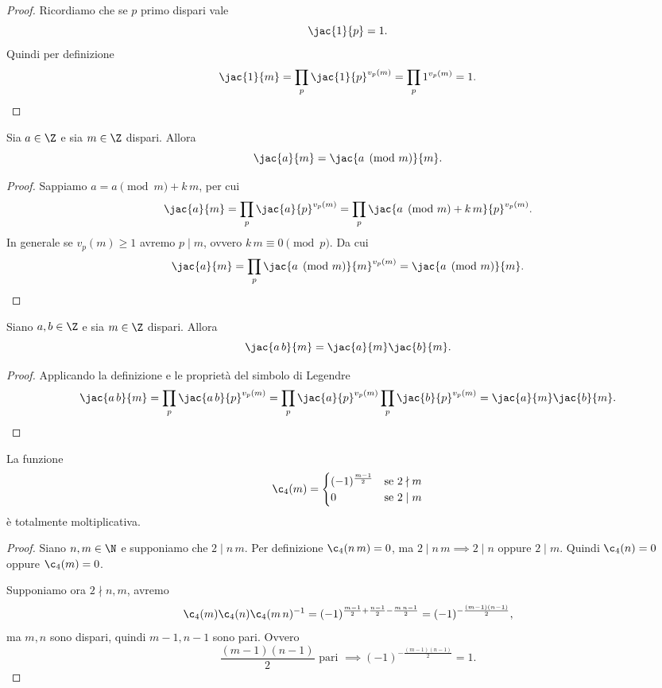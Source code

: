 \begin{proof}
	Ricordiamo che se \(p\) primo dispari vale
	\[
		\jac{1}{p} = 1.
	\]
	Quindi per definizione
	\[
		\jac{1}{m} = \prod_p \jac{1}{p}^{v_p(m)} = \prod_p 1^{v_p(m)} =1.\qedhere
	\]
\end{proof}

\begin{pr}
	Sia \(a\in \Z\) e sia \(m\in \Z\) dispari. Allora
	\[
		\jac{a}{m} = \jac{a \pmod{m}}{m}.
	\]
\end{pr}

\begin{proof}
	Sappiamo \(a= a\pmod{m}+k\,m\), per cui
	\[
		\jac{a}{m} = \prod_p \jac{a}{p}^{v_p(m)} = \prod_p \jac{a\pmod{m}+k\,m}{p}^{v_p(m)}.
	\]
	In generale se \(v_p(m)\ge 1\) avremo \(p\mid m\), ovvero \(k\,m \equiv 0\pmod{p}\).
	Da cui
	\[
		\jac{a}{m} = \prod_p \jac{a \pmod{m}}{m}^{v_p(m)} = \jac{a\pmod{m}}{m}.\qedhere
	\]
\end{proof}

\begin{pr}
	Siano \(a,b\in \Z\) e sia \(m\in\Z\) dispari.
	Allora
	\[
		\jac{a\,b}{m} = \jac{a}{m} \jac{b}{m}.
	\]
\end{pr}

\begin{proof}
	Applicando la definizione e le proprietà del simbolo di Legendre
	\[
		\jac{a\,b}{m} = \prod_p \jac{a\,b}{p}^{v_p(m)} = \prod_p \jac{a}{p}^{v_p(m)}\prod_p \jac{b}{p}^{v_p(m)} = \jac{a}{m}\jac{b}{m}.\qedhere
	\]
\end{proof}

\begin{lem}
	La funzione
	\[
		\c_4(m) = 	\begin{cases}
			(-1)^{\frac{m-1}{2}} & \text{se }2\nmid m \\
			0                    & \text{se }2\mid m
		\end{cases}
	\]
	è totalmente moltiplicativa.
\end{lem}

\begin{proof}
	Siano \(n,m\in\N\) e supponiamo che \(2\mid n\,m\).
	Per definizione \(\c_4(n\,m)=0\), ma \(2\mid n\,m\implies 2\mid n\) oppure \(2\mid m\).
	Quindi \(\c_4(n)=0\) oppure \(\c_4(m)=0\).

	Supponiamo ora \(2\nmid n,m\), avremo
	\[
		\c_4(m)\c_4(n)\c_4(m\,n)^{-1} = (-1)^{\frac{m-1}{2}+\frac{n-1}{2}-\frac{m\,n-1}{2}} = (-1)^{-\frac{(m-1)(n-1)}{2}},
	\]
	ma \(m,n\) sono dispari, quindi \(m-1,n-1\) sono pari.
	Ovvero
	\[
		\frac{(m-1)(n-1)}{2}\text{ pari }\implies (-1)^{-\frac{(m-1)(n-1)}{2}} = 1.
	\]
\end{proof}

